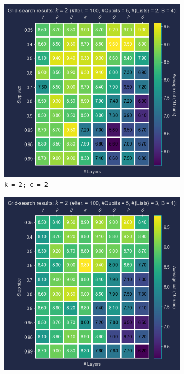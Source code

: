 \begin{figure}[ht!]
  \centering
  \begin{subfigure}[b]{0.325\textwidth}
      \centering
      \includegraphics[width=1\textwidth]{Figures/Chapter_5/k=2(Grid_Search)/iQAQE_k2_Grid_Search_step_size_n_layers_c=2.png}
      \caption{\texttt{k = 2; c = 2}}
      \label{fig:k=2;c=2}
  \end{subfigure}
  \hfill
  \begin{subfigure}[b]{0.325\textwidth}
      \centering
      \includegraphics[width=1\textwidth]{Figures/Chapter_5/k=2(Grid_Search)/iQAQE_k2_Grid_Search_step_size_n_layers_c=3.png}

\end{subfigure}
\end{figure}
